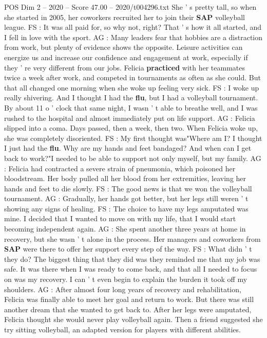 \begin{textsample}{POS Dim 2 – 2020 – Score 47.00 – 2020/t004296.txt}
She ' s pretty tall, so when she started in 2005, her coworkers recruited her to join their \textbf{SAP} volleyball league.
FS : It was all paid for, so why not, right?
That ' s how it all started, and I fell in love with the sport.
AG : Many leaders fear that hobbies are a distraction from work, but plenty of evidence shows the opposite.
Leisure activities can energize us and increase our confidence and engagement at work, especially if they ' re very different from our jobs.
Felicia \textbf{practiced} with her teammates twice a week after work, and competed in tournaments as often as she could.
But that all changed one morning when she woke up feeling very sick.
FS : I woke up really shivering.
And I thought I had the \textbf{flu}, but I had a volleyball tournament.
By about 11 o ' clock that same night, I wasn ' t able to breathe well, and I was rushed to the hospital and almost immediately put on life support.
AG : Felicia slipped into a coma.
Days passed, then a week, then two.
When Felicia woke up, she was completely disoriented.
FS : My first thought was"Where am I?
I thought I just had the \textbf{flu}.
Why are my hands and feet bandaged?
And when can I get back to work?"I needed to be able to support not only myself, but my family.
AG : Felicia had contracted a severe strain of pneumonia, which poisoned her bloodstream.
Her body pulled all her blood from her extremities, leaving her hands and feet to die slowly.
FS : The good news is that we won the volleyball tournament.
AG : Gradually, her hands got better, but her legs still weren ' t showing any signs of healing.
FS : The choice to have my legs amputated was mine.
I decided that I wanted to move on with my life, that I would start becoming independent again.
AG : She spent another three years at home in recovery, but she wasn ' t alone in the process.
Her managers and coworkers from \textbf{SAP} were there to offer her support every step of the way.
FS : What didn ' t they do?
The biggest thing that they did was they reminded me that my job was safe.
It was there when I was ready to come back, and that all I needed to focus on was my recovery.
I can ' t even begin to explain the burden it took off my shoulders.
AG : After almost four long years of recovery and rehabilitation, Felicia was finally able to meet her goal and return to work.
But there was still another dream that she wanted to get back to.
After her legs were amputated, Felicia thought she would never play volleyball again.
Then a friend suggested she try sitting volleyball, an adapted version for players with different abilities.

\end{textsample}
